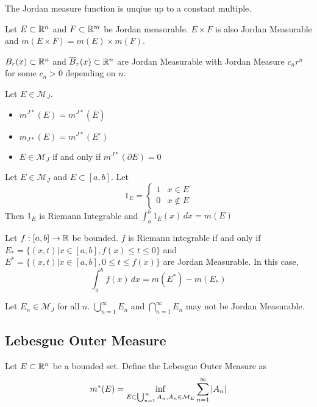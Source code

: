 \documentclass[a4paper]{article}
\begin{document}
\begin{thm} The Jordan measure function is unqiue up to a constant multiple. 
\end{thm}

\begin{prp} Let $E\subset\mathbb{R}^n$ and $F\subset\mathbb{R}^m$ be Jordan measurable. $E\times F$ is also Jordan Measurable and $m(E\times F)=m(E)\times m(F)$. 
\end{prp}

\begin{prp} $B_r(x)\subset\mathbb{R}^n$ and $\overline{B}_r(x)\subset\mathbb{R}^n$ are Jordan Measurable with Jordan Measure $c_nr^n$ for some $c_n>0$ depending on $n$. 
\end{prp}

\begin{prp} Let $E\in\mathcal{M}_J$. 
\begin{itemize}
\item $m^{J\ast}(E)=m^{J\ast}(\overline{E})$
\item $m_{J\ast}(E)=m^{J\ast}(E^\circ)$
\item $E\in\mathcal{M}_J$ if and only if $m^{J\ast}(\partial E)=0$
\end{itemize}
\end{prp}

\begin{prp} Let $E\in\mathcal{M}_J$ and $E\subset[a,b]$. Let $$1_E=\begin{cases}
1 & x\in E\\
0 & x\notin E
\end{cases}$$ Then $1_E$ is Riemann Integrable and $\int_a^b 1_E(x)\,dx=m(E)$
\end{prp}

\begin{prp} Let $f:[a,b]\to\mathbb{R}$ be bounded. $f$ is Riemann integrable if and only if $E_\ast=\{(x,t)|x\in[a,b],f(x)\leq t\leq 0\}$ and $E^\ast=\{(x,t)|x\in[a,b],0\leq t\leq f(x)\}$ are Jordan Measurable. In this case, $$\int_a^bf(x)\,dx=m(E^\ast)-m(E_\ast)$$
\end{prp}

\begin{lmm} Let $E_n\in\mathcal{M}_J$ for all $n$. $\bigcup_{n=1}^\infty E_n$ and $\bigcap_{n=1}^\infty E_n$ may not be Jordan Measurable. 
\end{lmm}

\subsection{Lebesgue Outer Measure}
\begin{defn} Let $E\subset\mathbb{R}^n$ be a bounded set. Define the Lebesgue Outer Measure as $$m^\ast(E)=\inf_{E\subset \bigcup_{n=1}^\infty A_n,A_n\in\mathcal{M}_E}\sum_{n=1}^\infty\abs{A_n}$$
\end{defn}
\end{document}
